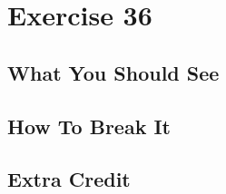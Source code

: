 \chapter{Exercise 36}


\section{What You Should See}


\section{How To Break It}


\section{Extra Credit}



